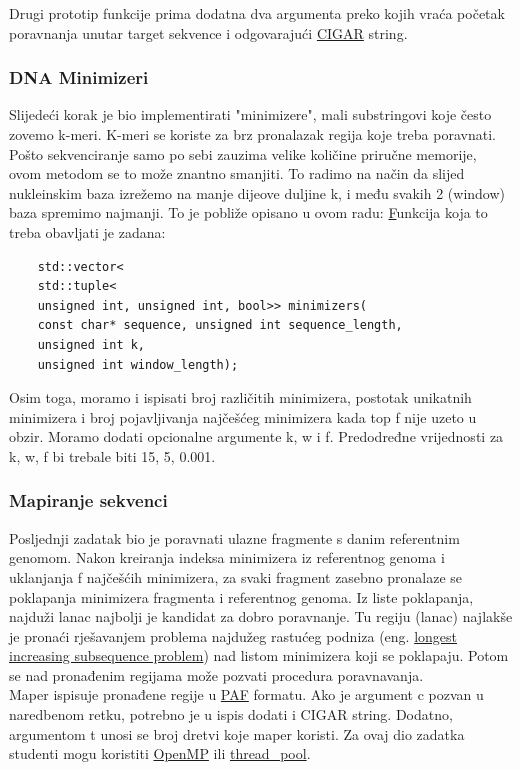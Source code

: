 \documentclass[times, 12pt, utf8]{article}
\begin{document}
	Drugi prototip funkcije prima dodatna dva argumenta preko kojih
	vraća početak poravnanja unutar \colorbox{gray!30}{target}
	sekvence i odgovarajući \href {https://samtools.github.io/hts-specs/SAMv1.pdf}{CIGAR} string.
	
	\subsubsection{DNA Minimizeri}
	Slijedeći korak je bio implementirati "minimizere", mali substringovi koje često zovemo k-meri. K-meri se koriste za brz pronalazak regija koje treba poravnati. Pošto sekvenciranje samo po sebi zauzima velike količine priručne memorije, ovom metodom se to može znantno smanjiti. To radimo na način da slijed nukleinskim baza izrežemo na manje dijeove duljine k, i među svakih 2 (window) baza spremimo najmanji. To je pobliže opisano u ovom radu: \href{https://academic.oup.com/bioinformatics/article/20/18/3363/202143} Funkcija koja to treba obavljati je zadana:
	
	\begin{lstlisting}
	std::vector<
	std::tuple<
	unsigned int, unsigned int, bool>> minimizers(
	const char* sequence, unsigned int sequence_length,
	unsigned int k,
	unsigned int window_length);
	\end{lstlisting}
	
	Osim toga, moramo i ispisati broj različitih minimizera, postotak unikatnih minimizera i broj pojavljivanja najčešćeg minimizera kada top f nije uzeto u obzir. Moramo dodati opcionalne argumente \colorbox{gray!30}{k}, \colorbox{gray!30}{w} i \colorbox{gray!30}{f}. Predodređne vrijednosti za \colorbox{gray!30}{k, w, f} bi trebale biti \colorbox{gray!30}{15, 5, 0.001}.
	\subsubsection{Mapiranje sekvenci}
	Posljednji zadatak bio je poravnati ulazne fragmente s danim referentnim genomom.
	Nakon kreiranja indeksa minimizera iz referentnog genoma i uklanjanja f najčešćih minimizera, za svaki fragment zasebno pronalaze se poklapanja minimizera fragmenta i referentnog genoma. Iz liste poklapanja, najduži lanac najbolji je kandidat za dobro poravnanje. Tu regiju (lanac) najlakše je pronaći rješavanjem problema najdužeg rastućeg podniza (eng. \href{https://en.wikipedia.org/wiki/Longest_increasing_subsequence}{longest increasing subsequence problem}) nad listom minimizera koji se poklapaju. 
	Potom se nad pronađenim regijama može pozvati procedura poravnavanja. \\
	Maper ispisuje pronađene regije u \href{https://github.com/lh3/miniasm/blob/master/PAF.md}{PAF} formatu. Ako je argument \colorbox{gray!30}{c} pozvan u naredbenom retku, potrebno je u ispis dodati i CIGAR string.
	Dodatno, argumentom \colorbox{gray!30}{t} unosi se broj dretvi koje maper koristi. Za ovaj dio zadatka studenti mogu koristiti \href{https://www.openmp.org/}{OpenMP} ili \href{https://github.com/rvaser/thread_pool}{thread\_pool}.
	
\end{document}
